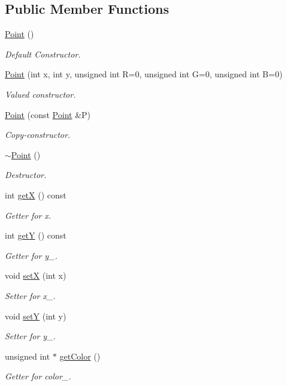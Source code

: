 \subsection*{Public Member Functions}
\begin{DoxyCompactItemize}
\item 
\mbox{\hyperlink{class_point_ad92f2337b839a94ce97dcdb439b4325a}{Point}} ()
\begin{DoxyCompactList}\small\item\em Default Constructor. \end{DoxyCompactList}\item 
\mbox{\hyperlink{class_point_af6c52ba545e9d933632b6d4edbf86622}{Point}} (int x, int y, unsigned int R=0, unsigned int G=0, unsigned int B=0)
\begin{DoxyCompactList}\small\item\em Valued constructor. \end{DoxyCompactList}\item 
\mbox{\hyperlink{class_point_a7e32c5a7f878c49ed9f1777b622cc06c}{Point}} (const \mbox{\hyperlink{class_point}{Point}} \&P)
\begin{DoxyCompactList}\small\item\em Copy-\/constructor. \end{DoxyCompactList}\item 
\mbox{\hyperlink{class_point_a395fa04b4ec126b66fc053f829a30cc1}{$\sim$\+Point}} ()
\begin{DoxyCompactList}\small\item\em Destructor. \end{DoxyCompactList}\item 
int \mbox{\hyperlink{class_point_ac9d5859db121c7d1b89ca89266dca0a3}{getX}} () const
\begin{DoxyCompactList}\small\item\em Getter for x. \end{DoxyCompactList}\item 
int \mbox{\hyperlink{class_point_a86d10ff46e08462c45b15a8c7ef62d61}{getY}} () const
\begin{DoxyCompactList}\small\item\em Getter for y\+\_\+. \end{DoxyCompactList}\item 
void \mbox{\hyperlink{class_point_acdc86ab607b2ae8415152883e2629015}{setX}} (int x)
\begin{DoxyCompactList}\small\item\em Setter for x\+\_\+. \end{DoxyCompactList}\item 
void \mbox{\hyperlink{class_point_afccad787a359f062efc1af5e935a99ba}{setY}} (int y)
\begin{DoxyCompactList}\small\item\em Setter for y\+\_\+. \end{DoxyCompactList}\item 
unsigned int $\ast$ \mbox{\hyperlink{class_point_a1aa902dd929328baec8c8f6970284ac2}{get\+Color}} ()
\begin{DoxyCompactList}\small\item\em Getter for color\+\_\+. \end{DoxyCompactList}\end{DoxyCompactItemize}
